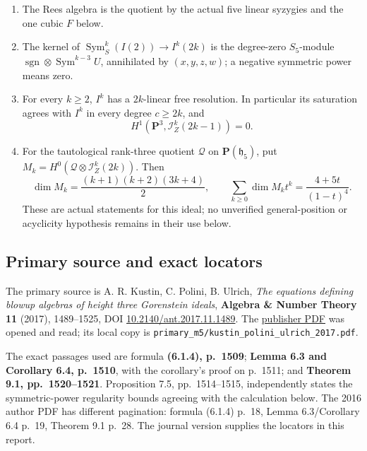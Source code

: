 \documentclass[
  10pt,
]{article}
\providecommand{\tightlist}{%
  \setlength{\itemsep}{0pt}\setlength{\parskip}{0pt}}
\providecommand{\tightlist}{\setlength{\itemsep}{0pt}\setlength{\parskip}{0pt}}
\begin{document}
\begin{enumerate}
\def\labelenumi{\arabic{enumi}.}
\tightlist
\item
  The Rees algebra is the quotient by the actual five linear syzygies
  and the one cubic \(F\) below.
\item
  The kernel of \(\operatorname{Sym}^k_S(I(2))\to I^k(2k)\) is the
  degree-zero \(S_5\)-module
  \(\operatorname{sgn}\otimes\operatorname{Sym}^{k-3}U\), annihilated by
  \((x,y,z,w)\); a negative symmetric power means zero.
\item
  For every \(k\ge2\), \(I^k\) has a \(2k\)-linear free resolution. In
  particular its saturation agrees with \(I^k\) in every degree
  \(c\ge2k\), and \[
  H^1(\mathbf P^3,\mathcal I_Z^k(2k-1))=0.
  \]
\item
  For the tautological rank-three quotient \(\mathcal Q\) on
  \(\mathbf P(\mathfrak h_5)\), put
  \(M_k=H^0(\mathcal Q\otimes\mathcal I_Z^k(2k))\). Then \[
  \dim M_k=\frac{(k+1)(k+2)(3k+4)}2,
  \qquad
  \sum_{k\ge0}\dim M_k t^k=\frac{4+5t}{(1-t)^4}.
  \] These are actual statements for this ideal; no unverified
  general-position or acyclicity hypothesis remains in their use below.
\end{enumerate}

\subsection{Primary source and exact
locators}\label{primary-source-and-exact-locators}

The primary source is A. R. Kustin, C. Polini, B. Ulrich, \emph{The
equations defining blowup algebras of height three Gorenstein ideals},
\textbf{Algebra \& Number Theory 11} (2017), 1489--1525, DOI
\href{https://doi.org/10.2140/ant.2017.11.1489}{10.2140/ant.2017.11.1489}.
The \href{https://msp.org/ant/2017/11-7/ant-v11-n7-p01-p.pdf}{publisher
PDF} was opened and read; its local copy is
\texttt{\small primary\_\allowbreak{}m5/\allowbreak{}kustin\_\allowbreak{}polini\_\allowbreak{}ulrich\_\allowbreak{}2017.pdf}.

The exact passages used are formula \textbf{(6.1.4), p.~1509};
\textbf{Lemma 6.3 and Corollary 6.4, p.~1510}, with the corollary's
proof on p.~1511; and \textbf{Theorem 9.1, pp.~1520--1521}. Proposition
7.5, pp.~1514--1515, independently states the symmetric-power regularity
bounds agreeing with the calculation below. The 2016 author PDF has
different pagination: formula (6.1.4) p.~18, Lemma 6.3/Corollary 6.4
p.~19, Theorem 9.1 p.~28. The journal version supplies the locators in
this report.
\end{document}
